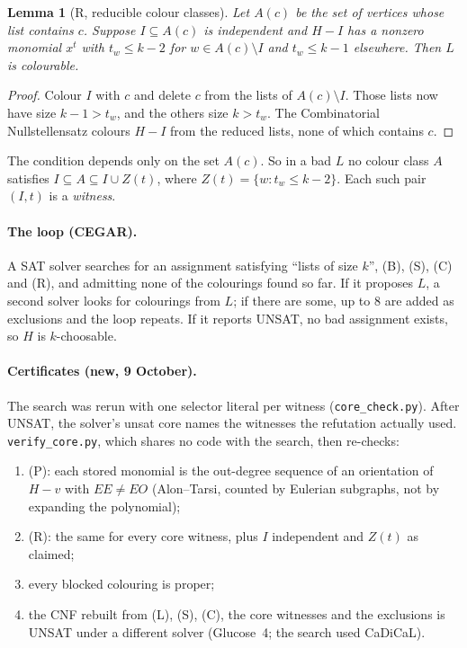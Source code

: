 \documentclass[11pt]{article}
\theoremstyle{plain}
\newtheorem{lemma}[theorem]{Lemma}
\theoremstyle{definition}
\begin{document}
\begin{lemma}[R, reducible colour classes]
Let $A(c)$ be the set of vertices whose list contains $c$. Suppose $I \subseteq A(c)$ is
independent and $H - I$ has a nonzero monomial $x^t$ with $t_w \le k-2$ for
$w \in A(c) \setminus I$ and $t_w \le k-1$ elsewhere. Then $L$ is colourable.
\end{lemma}
\begin{proof}
Colour $I$ with $c$ and delete $c$ from the lists of $A(c) \setminus I$. Those lists now have
size $k-1 > t_w$, and the others size $k > t_w$. The Combinatorial Nullstellensatz colours
$H - I$ from the reduced lists, none of which contains $c$.
\end{proof}
The condition depends only on the set $A(c)$. So in a bad $L$ no colour class $A$ satisfies
$I \subseteq A \subseteq I \cup Z(t)$, where $Z(t) = \{w : t_w \le k-2\}$. Each such pair
$(I, t)$ is a \emph{witness}.

\paragraph{The loop (CEGAR).} A SAT solver searches for an assignment satisfying ``lists of size
$k$'', (B), (S), (C) and (R), and admitting none of the colourings found so far. If it proposes
$L$, a second solver looks for colourings from $L$; if there are some, up to 8 are added as
exclusions and the loop repeats. If it reports UNSAT, no bad assignment exists, so $H$ is
$k$-choosable.

\paragraph{Certificates (new, 9 October).} The search was rerun with one selector literal per
witness (\texttt{core\_check.py}). After UNSAT, the solver's unsat core names the witnesses the
refutation actually used. \texttt{verify\_core.py}, which shares no code with the search,
then re-checks:
\begin{enumerate}[nosep]
  \item (P): each stored monomial is the out-degree sequence of an orientation of $H - v$ with
        $EE \ne EO$ (Alon--Tarsi, counted by Eulerian subgraphs, not by expanding the
        polynomial);
  \item (R): the same for every core witness, plus $I$ independent and $Z(t)$ as claimed;
  \item every blocked colouring is proper;
  \item the CNF rebuilt from (L), (S), (C), the core witnesses and the exclusions is UNSAT under a
        different solver (Glucose~4; the search used CaDiCaL).
\end{enumerate}
\end{document}
